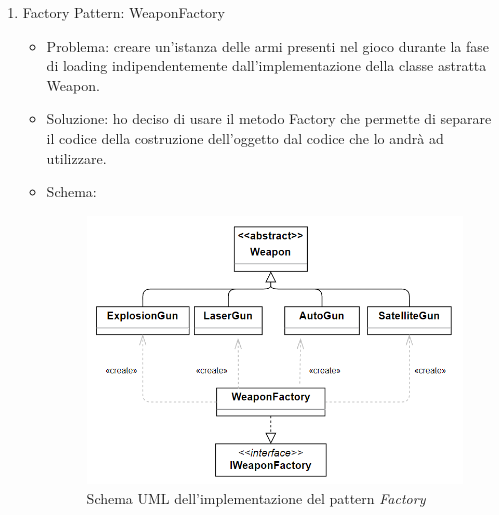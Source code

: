\documentclass[a4paper,12pt]{report}
\begin{document}
\begin{enumerate}

	
	\item Factory Pattern: WeaponFactory
			
	\begin{itemize}
		\item Problema: creare un'istanza delle armi presenti nel gioco durante la fase di loading indipendentemente dall'implementazione della classe astratta Weapon.
		\item Soluzione: ho deciso di usare il metodo Factory che permette di separare il codice della costruzione dell'oggetto dal codice che lo andrà ad utilizzare.
		\item Schema:
		\begin{figure}[H]
			\centering{}
			\includegraphics[width=\textwidth]{img/factory.png}
			\caption{Schema UML dell'implementazione del pattern \emph{Factory}}
			\label{img:Factory Pattern}
		\end{figure}
	\end{itemize}
	

\end{enumerate}
\end{document}

